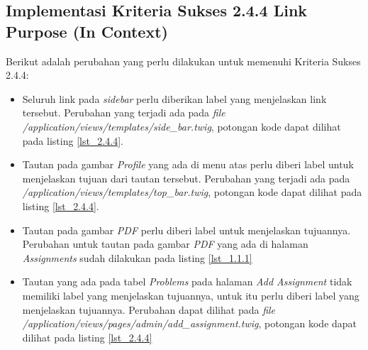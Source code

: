 \subsection{Implementasi Kriteria Sukses 2.4.4 Link Purpose (In Context)}
\label{subsec:implementasi_A_2.4.4}

Berikut adalah perubahan yang perlu dilakukan untuk memenuhi Kriteria Sukses 2.4.4:

\begin{itemize}
	\item Seluruh link pada \textit{sidebar} perlu diberikan label yang menjelaskan link tersebut. Perubahan yang terjadi ada pada \textit{file} \textit{/application/views/templates/side\_bar.twig}, potongan kode dapat dilihat pada listing \ref{lst_2.4.4}.

	\item Tautan pada gambar \textit{Profile} yang ada di menu atas perlu diberi label untuk menjelaskan tujuan dari tautan tersebut. Perubahan yang terjadi ada pada \textit{/application/views/templates/top\_bar.twig}, potongan kode dapat dilihat pada listing \ref{lst_2.4.4}.

	\item Tautan pada gambar \textit{PDF} perlu diberi label untuk menjelaskan tujuannya. Perubahan untuk tautan pada gambar \textit{PDF} yang ada di halaman \textit{Assignments} sudah dilakukan pada listing \ref{lst_1.1.1}
	
	\item Tautan yang ada pada tabel \textit{Problems} pada halaman \textit{Add Assignment} tidak memiliki label yang menjelaskan tujuannya, untuk itu perlu diberi label yang menjelaskan tujuannya. Perubahan dapat dilihat pada \textit{file} \textit{/application/views/pages/admin/add\_assignment.twig}, potongan kode dapat dilihat pada listing \ref{lst_2.4.4}
	

\end{itemize}
